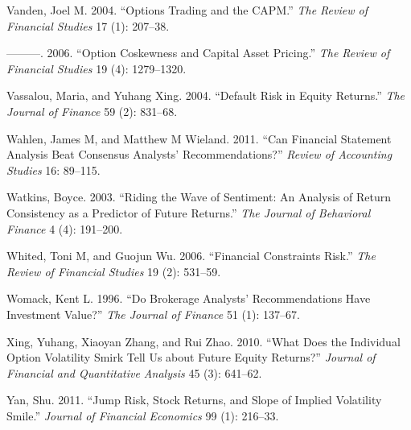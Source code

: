 \documentclass[
  letterpaper,
  DIV=11,
  numbers=noendperiod]{scrreprt}
\newlength{\cslhangindent}
\newlength{\cslentryspacingunit} %
\newenvironment{CSLReferences}[2] %
 {%
  \setlength{\parindent}{0pt}
  \ifodd #1
  \let\oldpar\par
  \def\par{\hangindent=\cslhangindent\oldpar}
  \fi
  \setlength{\parskip}{#2\cslentryspacingunit}
 }%
 {}
\begin{document}
\begin{CSLReferences}{1}{0}
\leavevmode{}%
Vanden, Joel M. 2004. {``Options Trading and the CAPM.''} \emph{The
Review of Financial Studies} 17 (1): 207--38.

\leavevmode{}%
---------. 2006. {``Option Coskewness and Capital Asset Pricing.''}
\emph{The Review of Financial Studies} 19 (4): 1279--1320.

\leavevmode{}%
Vassalou, Maria, and Yuhang Xing. 2004. {``Default Risk in Equity
Returns.''} \emph{The Journal of Finance} 59 (2): 831--68.

\leavevmode{}%
Wahlen, James M, and Matthew M Wieland. 2011. {``Can Financial Statement
Analysis Beat Consensus Analysts' Recommendations?''} \emph{Review of
Accounting Studies} 16: 89--115.

\leavevmode{}%
Watkins, Boyce. 2003. {``Riding the Wave of Sentiment: An Analysis of
Return Consistency as a Predictor of Future Returns.''} \emph{The
Journal of Behavioral Finance} 4 (4): 191--200.

\leavevmode{}%
Whited, Toni M, and Guojun Wu. 2006. {``Financial Constraints Risk.''}
\emph{The Review of Financial Studies} 19 (2): 531--59.

\leavevmode{}%
Womack, Kent L. 1996. {``Do Brokerage Analysts' Recommendations Have
Investment Value?''} \emph{The Journal of Finance} 51 (1): 137--67.

\leavevmode{}%
Xing, Yuhang, Xiaoyan Zhang, and Rui Zhao. 2010. {``What Does the
Individual Option Volatility Smirk Tell Us about Future Equity
Returns?''} \emph{Journal of Financial and Quantitative Analysis} 45
(3): 641--62.

\leavevmode{}%
Yan, Shu. 2011. {``Jump Risk, Stock Returns, and Slope of Implied
Volatility Smile.''} \emph{Journal of Financial Economics} 99 (1):
216--33.

\end{CSLReferences}
\end{document}
